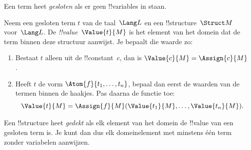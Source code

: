 \documentclass[openany]{memoir}
\begin{document}


\begin{explain}
Een term heet \emph{gesloten} als er geen !!{variable}s in staan.
\end{explain}

\begin{defn}
Neem een gesloten term $t$ van de taal~$\Lang L$ en een
!!{structure}~$\Struct M$ voor~$\Lang L$. De
\emph{!!{value}}~$\Value{t}{M}$ is het element van het domein dat de
term binnen deze structuur aanwijst. Je bepaalt die waarde zo:
\begin{enumerate}
\item Bestaat $t$ alleen uit de !!{constant}~$c$, dan is
  $\Value{c}{M} = \Assign{c}{M}$.
\item Heeft $t$ de vorm $\Atom{f}{t_1, \ldots, t_n}$, bepaal dan eerst
  de waarden van de termen binnen de haakjes. Pas daarna de functie toe:
  \[
  \Value{t}{M} = \Assign{f}{M}(\Value{t_1}{M}, \ldots,
  \Value{t_n}{M}).
  \]
\end{enumerate}
\end{defn}

\begin{defn}
Een !!{structure} heet \emph{gedekt} als elk element van het domein de
!!{value} van een gesloten term is. Je kunt dan dus elk domeinelement
met minstens één term zonder variabelen aanwijzen.
\end{defn}
\end{document}

